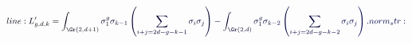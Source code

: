 \documentclass[12pt]{article}
\begin{document}
\makeatletter
\renewcommand*{\@textcolor}[3]{%
  \protect\leavevmode
  \begingroup
    \color#1{#2}#3%
  \endgroup
}
\makeatother
\begin{displaymath}
\mathcolor[RGB]{0,0,15}{line:
L'_{g,d,k}=\int_{\Gr(2,d+1)}} \mathcolor[RGB]{0,0,30}{\sigma_1^g} \mathcolor[RGB]{0,0,45}{\sigma_{k-1}\left(\sum_{i+j=2d-g-k-1}\sigma_i\sigma_j\right)-\int_{\Gr(2,d)}\sigma_1^g} \mathcolor[RGB]{0,0,60}{\sigma_{k-2}\left(\sum_{i+j=2d-g-k-2}} \mathcolor[RGB]{0,0,75}{\sigma_i\sigma_j\right).

norm_str:}
\end{displaymath}
\end{document}
